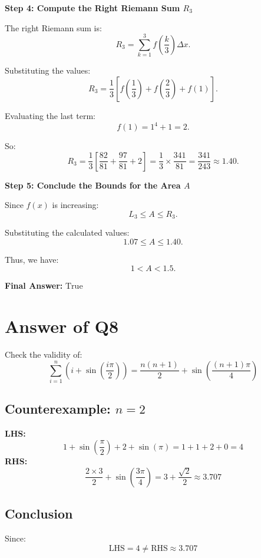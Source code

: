 \documentclass{article}
\begin{document}
\vspace{0.5cm}
\noindent
\textbf{Step 4: Compute the Right Riemann Sum \(R_3\)}

The right Riemann sum is:
\[
R_3 = \sum_{k=1}^{3} f\left(\frac{k}{3}\right) \Delta x.
\]

Substituting the values:
\[
R_3 = \frac{1}{3} \left[ f\left(\frac{1}{3}\right) + f\left(\frac{2}{3}\right) + f(1) \right].
\]

Evaluating the last term:
\[
f(1) = 1^4 + 1 = 2.
\]

So:
\[
R_3 = \frac{1}{3} \left[\frac{82}{81} + \frac{97}{81} + 2\right] = \frac{1}{3} \times \frac{341}{81} = \frac{341}{243} \approx 1.40.
\]

\vspace{0.5cm}
\noindent
\textbf{Step 5: Conclude the Bounds for the Area \(A\)}

Since \(f(x)\) is increasing:
\[
L_3 \leq A \leq R_3.
\]

Substituting the calculated values:
\[
1.07 \leq A \leq 1.40.
\]

Thus, we have:
\[
1 < A < 1.5.
\]

\vspace{0.5cm}
\noindent
\textbf{Final Answer:} \(\boxed{\text{True}}\)


\section*{Answer of Q8}

Check the validity of:
\[
\sum_{i=1}^{n} \left( i + \sin\left(\frac{i\pi}{2}\right) \right) 
= \frac{n(n+1)}{2} + \sin\left( \frac{(n+1)\pi}{4} \right)
\]

\subsection*{Counterexample: $n=2$}

\textbf{LHS:}
\[
1 + \sin\left(\frac{\pi}{2}\right) + 2 + \sin(\pi) = 1 + 1 + 2 + 0 = 4
\]
\noindent
\textbf{RHS:}
\[
\frac{2 \times 3}{2} + \sin\left(\frac{3\pi}{4}\right) = 3 + \frac{\sqrt{2}}{2} \approx 3.707
\]

\subsection*{Conclusion}



Since:
\[
\text{LHS} = 4 \neq \text{RHS} \approx 3.707
\]
\end{document}
